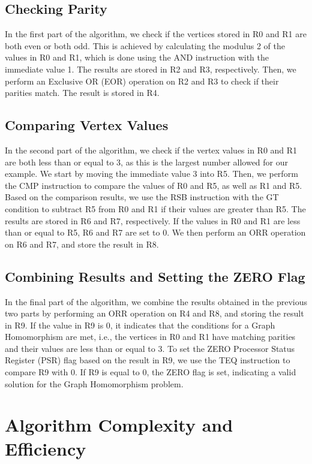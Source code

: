 \subsection{Checking Parity}

In the first part of the algorithm, we check if the vertices stored in R0 and R1 are both even or both odd. This is achieved by calculating the modulus 2 of the values in R0 and R1, which is done using the AND instruction with the immediate value 1. The results are stored in R2 and R3, respectively. Then, we perform an Exclusive OR (EOR) operation on R2 and R3 to check if their parities match. The result is stored in R4.

\subsection{Comparing Vertex Values}

In the second part of the algorithm, we check if the vertex values in R0 and R1 are both less than or equal to 3, as this is the largest number allowed for our example. We start by moving the immediate value 3 into R5. Then, we perform the CMP instruction to compare the values of R0 and R5, as well as R1 and R5. Based on the comparison results, we use the RSB instruction with the GT condition to subtract R5 from R0 and R1 if their values are greater than R5. The results are stored in R6 and R7, respectively. If the values in R0 and R1 are less than or equal to R5, R6 and R7 are set to 0. We then perform an ORR operation on R6 and R7, and store the result in R8.

\subsection{Combining Results and Setting the ZERO Flag}

In the final part of the algorithm, we combine the results obtained in the previous two parts by performing an ORR operation on R4 and R8, and storing the result in R9. If the value in R9 is 0, it indicates that the conditions for a Graph Homomorphism are met, i.e., the vertices in R0 and R1 have matching parities and their values are less than or equal to 3. To set the ZERO Processor Status Register (PSR) flag based on the result in R9, we use the TEQ instruction to compare R9 with 0. If R9 is equal to 0, the ZERO flag is set, indicating a valid solution for the Graph Homomorphism problem.

\section{Algorithm Complexity and Efficiency}

